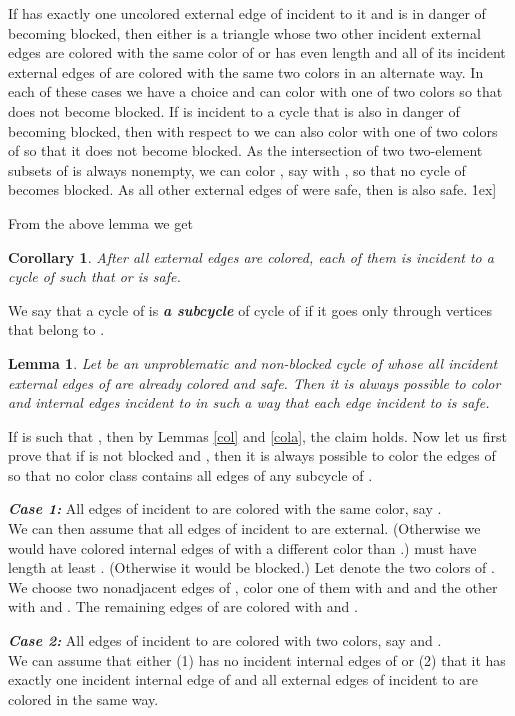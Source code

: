 \documentclass[a4, 11pt]{article}
\newcommand{\dowod}{\noindent{\bf Proof.~}}
\newcommand{\koniec}{\hfill \.1ex]}
\newcommand{\<}{\langle}
\renewcommand{\>}{\rangle}
\newtheorem{lemma}{Lemma}
\newtheorem{corollary}{Corollary}
\begin{document}
If  has exactly one uncolored external edge  of  incident to it and  is in  danger of becoming blocked, then either  is a triangle whose two other incident external edges are colored with the same color of   or   has even length and all of its  incident external edges of   are colored with the same two colors in an alternate way. In each of these cases we have a choice  and  can color  with one of two colors so that  does not become blocked. If  is  incident to a cycle  that is also in danger of becoming blocked,
then with respect to  we can also color  with one of two colors of   so that it does not become blocked.  As the intersection of two two-element subsets of  is always nonempty, we can color , say with ,  so that no cycle of  becomes blocked. As all other external edges of  were safe, then  is also safe. \koniec

From the above lemma we get
\begin{corollary}\label{colsafe}
After all external edges are colored, each of them is incident to a cycle  of  such that   or is safe.
\end{corollary}

We say that a cycle  of  is {\bf \em  a subcycle}  of cycle  of  if it goes only through vertices that belong to .

\begin{lemma} \label{coluzup}
Let  be an unproblematic  and non-blocked cycle of  whose all incident external edges of  are already colored and safe.  Then it is always possible to color  and internal  edges incident to   in such a way that each edge incident to  is safe.
\end{lemma} 

\dowod
If  is such that   , then by Lemmas \ref{col}  and \ref{cola},  the claim holds.
Now let us first  prove that if  is not blocked and   , then it is always  possible to color the edges of  so that no color class contains all edges of  any subcycle of  .

{\bf \em Case 1:}  All  edges of  incident to  are colored with the same color, say . \\
We can  then assume that all edges of  incident to  are external. (Otherwise we would have colored internal edges  of   with a different color than .)
 must have length at least . (Otherwise it would be blocked.)  Let   denote the two colors of .
We choose two nonadjacent edges of , color one of them with  and  and the other with  and . The remaining edges of  are colored with  and .

{\bf \em Case 2:}  All  edges of  incident to  are colored with two colors, say  and . \\
We can assume that either (1)   has no incident internal edges of   or (2)  that it has exactly one incident internal edge of  and all external edges of  incident to  are colored in the same way.
\end{document}
